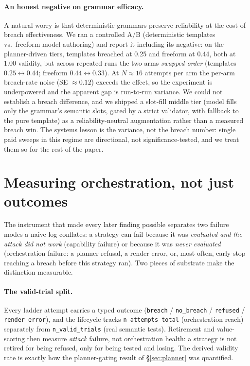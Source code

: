 \documentclass[letterpaper,twocolumn,10pt]{article}
\begin{document}
\paragraph{An honest negative on grammar efficacy.} A natural worry is that deterministic grammars preserve reliability at the cost of breach effectiveness. We ran a controlled A/B (deterministic templates vs.\ freeform model authoring) and report it including its negative: on the planner-driven tiers, templates breached at 0.25 and freeform at 0.44, both at 1.00 validity, but across repeated runs the two arms \emph{swapped order} (templates $0.25\leftrightarrow0.44$; freeform $0.44\leftrightarrow0.33$). At $N\approx16$ attempts per arm the per-arm breach-rate noise (SE $\approx0.12$) exceeds the effect, so the experiment is underpowered and the apparent gap is run-to-run variance. We could not establish a breach difference, and we shipped a slot-fill middle tier (model fills only the grammar's semantic slots, gated by a strict validator, with fallback to the pure template) as a reliability-neutral augmentation rather than a measured breach win. The systems lesson is the variance, not the breach number: single paid sweeps in this regime are directional, not significance-tested, and we treat them so for the rest of the paper.

\section{Measuring orchestration, not just outcomes}
\label{sec:telemetry}

The instrument that made every later finding possible separates two failure modes a naive log conflates: a strategy can fail because it was \emph{evaluated and the attack did not work} (capability failure) or because it was \emph{never evaluated} (orchestration failure: a planner refusal, a render error, or, most often, early-stop reaching a breach before this strategy ran). Two pieces of substrate make the distinction measurable.

\paragraph{The valid-trial split.} Every ladder attempt carries a typed outcome (\texttt{breach} / \texttt{no\_breach} / \texttt{refused} / \texttt{render\_error}), and the lifecycle tracks \texttt{n\_attempts\_total} (orchestration reach) separately from \texttt{n\_valid\_trials} (real semantic tests). Retirement and value-scoring then measure \emph{attack} failure, not orchestration health: a strategy is not retired for being refused, only for being tested and losing. The derived validity rate is exactly how the planner-gating result of \S\ref{sec:planner} was quantified.
\end{document}
